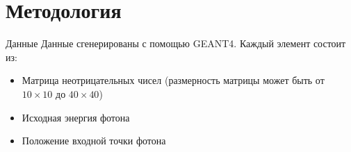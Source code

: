 \documentclass[9pt]{beamer}
\begin{document}
\section{Методология}

\begin{frame}{Данные}
    Данные сгенерированы с помощью GEANT4. Каждый элемент состоит из:

    \begin{itemize}
        \item Матрица неотрицательных чисел (размерность матрицы  может быть от $10 \times 10$ до $40 \times 40$)
        \item Исходная энергия фотона
        \item Положение входной точки фотона
    \end{itemize}

    \begin{figure}
        \centering
        \hskip4pt
    \end{figure}
\end{frame}
\end{document}
